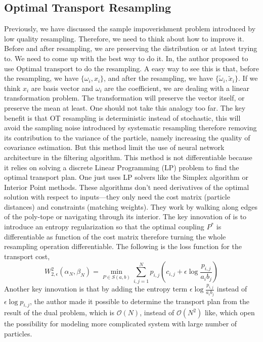 \documentclass{article}
\begin{document}
\subsection{Optimal Transport Resampling}
Previously, we have discussed the sample impoverishment problem introduced by low quality resampling. Therefore, we need to think about how to improve it. Before and after resampling, we are preserving the distribution or at latest trying to. We need to come up with the best way to do it. In\cite{reich2013nonparametric}, the author proposed to use Optimal transport to do the resampling. A easy way to see this is that, before the resampling, we have $\{\omega_i, x_i\}$, and after the resampling, we have $\{\tilde\omega_i, \tilde x_i\}$. If we think $x_i$ are basis vector and $\omega_i$ are the coefficient, we are dealing with a linear transformation problem. The transformation will preserve the vector itself, or preserve the mean at least. One should not take this analogy too far. The key benefit is that OT resampling is deterministic instead of stochastic, this will avoid the sampling noise introduced by systematic resampling therefore removing its contribution to the variance of the particle, namely increasing the quality of covariance estimation. But this method limit the use of neural network architecture in the filtering algorithm. This method is not differentiable because it relies on solving a discrete Linear Programming (LP) problem to find the optimal transport plan. One just uses LP solvers like the Simplex algorithm or Interior Point methods. These algorithms don't need derivatives of the optimal solution with respect to inputs—they only need the cost matrix (particle distances) and constraints (matching weights). They work by walking along edges of the poly-tope or navigating through its interior. The key innovation of \cite{corenflos-differentiable-2021} is to introduce an entropy regularization so that the optimal coupling $P^*$ is differentiable as function of the cost matrix therefore turning the whole resampling operation differentiable. The following is the loss function for the  transport cost,
\begin{equation}
    W_{2, \epsilon}^2 (\alpha_N, \beta_N) = \min_{P \in S(a, b)} \sum_{i,j=1}^N p_{i,j} \left( c_{i,j} + \epsilon \log \frac{p_{i,j}}{a_i b_j} \right)
\end{equation}
Another key innovation is that by adding the entropy term $\epsilon \log \frac{p_{i,j}}{a_i b_j}$ instead of $\epsilon \log p_{i,j}$, the author made it possible to determine the transport plan from the result of the dual problem, which is $\mathcal{O}(N)$, instead of $\mathcal{O}(N^2)$ like\cite{reich2013nonparametric}, which open the possibility for modeling more complicated system with large number of particles.
\end{document}
